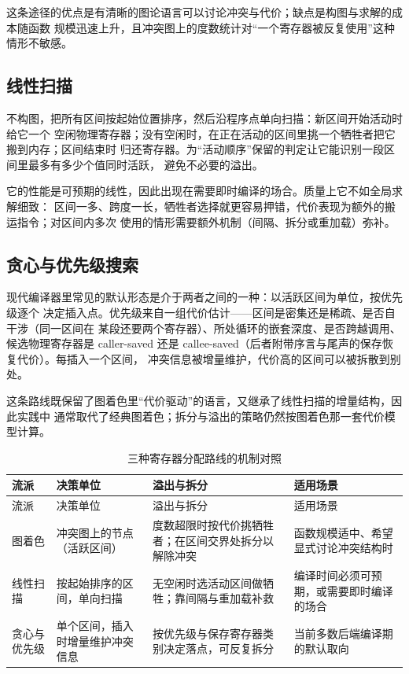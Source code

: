 \documentclass[12pt,a4paper,fontset=fandol]{ctexbook}
\begin{document}
这条途径的优点是有清晰的图论语言可以讨论冲突与代价；缺点是构图与求解的成本随函数
规模迅速上升，且冲突图上的度数统计对“一个寄存器被反复使用”这种情形不敏感。

\subsection{线性扫描}\label{sec:cl06-linscan}

不构图，把所有区间按起始位置排序，然后沿程序点单向扫描：新区间开始活动时给它一个
空闲物理寄存器；没有空闲时，在正在活动的区间里挑一个牺牲者把它搬到内存；区间结束时
归还寄存器。为“活动顺序”保留的判定让它能识别一段区间里最多有多少个值同时活跃，
避免不必要的溢出。

它的性能是可预期的线性，因此出现在需要即时编译的场合。质量上它不如全局求解细致：
区间一多、跨度一长，牺牲者选择就更容易押错，代价表现为额外的搬运指令；对区间内多次
使用的情形需要额外机制（间隔、拆分或重加载）弥补。

\subsection{贪心与优先级搜索}\label{sec:cl06-greedy}

现代编译器里常见的默认形态是介于两者之间的一种：以活跃区间为单位，按优先级逐个
决定插入点。优先级来自一组代价估计——区间是密集还是稀疏、是否自干涉（同一区间在
某段还要两个寄存器）、所处循环的嵌套深度、是否跨越调用、候选物理寄存器是
caller-saved 还是 callee-saved（后者附带序言与尾声的保存恢复代价）。每插入一个区间，
冲突信息被增量维护，代价高的区间可以被拆散到别处。

这条路线既保留了图着色里“代价驱动”的语言，又继承了线性扫描的增量结构，因此实践中
通常取代了经典图着色；拆分与溢出的策略仍然按图着色那一套代价模型计算。

\begin{longtable}{@{}>{\raggedright\arraybackslash}p{} >{\raggedright\arraybackslash}p{} >{\raggedright\arraybackslash}p{} >{\raggedright\arraybackslash}p{}@{}}
\caption{三种寄存器分配路线的机制对照}\label{tab:cl06-regalloc}\\
\toprule
流派 & 决策单位 & 溢出与拆分 & 适用场景 \\
\midrule
\endfirsthead
\toprule
流派 & 决策单位 & 溢出与拆分 & 适用场景 \\
\midrule
\endhead
\bottomrule
\endfoot
图着色 & 冲突图上的节点（活跃区间） & 度数超限时按代价挑牺牲者；在区间交界处拆分以解除冲突 &
  函数规模适中、希望显式讨论冲突结构时 \\
线性扫描 & 按起始排序的区间，单向扫描 & 无空闲时选活动区间做牺牲；靠间隔与重加载补救 &
  编译时间必须可预期，或需要即时编译的场合 \\
贪心与优先级 & 单个区间，插入时增量维护冲突信息 & 按优先级与保存寄存器类别决定落点，可反复拆分 &
  当前多数后端编译期的默认取向 \\
\end{longtable}
\end{document}
